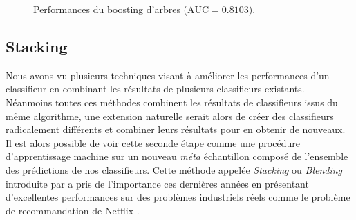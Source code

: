 \begin{figure}[htbp]
    \caption{Performances du boosting d'arbres ($\mathrm{AUC} = 0.8103$).}
\end{figure}

\subsection{Stacking}

Nous avons vu plusieurs techniques visant à améliorer les performances d'un classifieur en combinant les résultats de plusieurs classifieurs existants. Néanmoins toutes ces méthodes combinent les résultats de classifieurs issus du même algorithme, une extension naturelle serait alors de créer des classifieurs radicalement différents et combiner leurs résultats pour en obtenir de nouveaux.
Il est alors possible de voir cette seconde étape comme une procédure d'apprentissage machine sur un nouveau \emph{méta} échantillon composé de l'ensemble des prédictions de nos classifieurs. Cette méthode appelée \emph{Stacking} ou \emph{Blending} introduite par \citet{Wolpert1992} a pris de l'importance ces dernières années en présentant d'excellentes performances sur des problèmes industriels réels comme le problème de recommandation de Netflix \citep{Jahrer2009a,Bellkor2008,Bell2007,Jahrer2010}.

